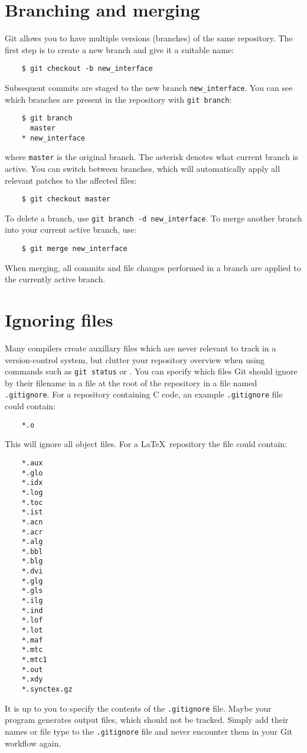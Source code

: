 \documentclass[11pt]{article}
\begin{document}
\section{Branching and merging}
Git allows you to have multiple versions (branches) of the same repository.  The 
first step is to create a new branch and give it a suitable name:
\begin{lstlisting}
    $ git checkout -b new_interface
\end{lstlisting}
Subsequent commits are staged to the new branch \texttt{new\_interface}.  You 
can see which branches are present in the repository with \texttt{git branch}:
\begin{lstlisting}
    $ git branch
      master
    * new_interface
\end{lstlisting}
where \texttt{master} is the original branch.  The asterisk denotes what current 
branch is active.  You can switch between branches, which will automatically 
apply all relevant patches to the affected files:
\begin{lstlisting}
    $ git checkout master
\end{lstlisting}
To delete a branch, use \texttt{git branch -d new\_interface}.  To merge another 
branch into your current active branch, use:
\begin{lstlisting}
    $ git merge new_interface
\end{lstlisting}
When merging, all commits and file changes performed in a branch are applied to 
the currently active branch.

\section{Ignoring files}
Many compilers create auxillary files which are never relevant to track in a 
version-control system, but clutter your repository overview when using commands 
such as \texttt{git status} or .  You can specify which 
files Git should ignore by their filename in a file at the root of the 
repository in a file named \texttt{.gitignore}.
For a repository containing C code, an example \texttt{.gitignore} file could 
contain:
\begin{lstlisting}
    *.o
\end{lstlisting}
This will ignore all object files.  For a \LaTeX~repository the file could 
contain:
\begin{lstlisting}
    *.aux
    *.glo
    *.idx
    *.log
    *.toc
    *.ist
    *.acn
    *.acr
    *.alg
    *.bbl
    *.blg
    *.dvi
    *.glg
    *.gls
    *.ilg
    *.ind
    *.lof
    *.lot
    *.maf
    *.mtc
    *.mtc1
    *.out
    *.xdy
    *.synctex.gz
\end{lstlisting}
It is up to you to specify the contents of the \texttt{.gitignore} file.  Maybe 
your program generates output files, which should not be tracked. Simply add 
their names or file type to the \texttt{.gitignore} file and never encounter 
them in your Git workflow again.
\end{document}
